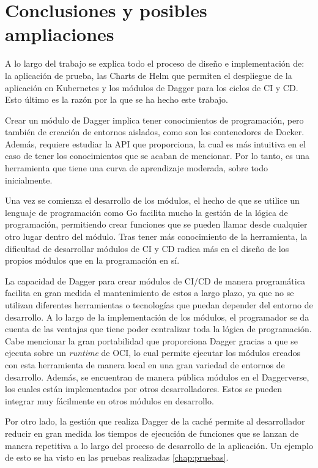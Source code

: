 \chapter{Conclusiones y posibles ampliaciones}


A lo largo del trabajo se explica todo el proceso de diseño e implementación de: la aplicación de prueba, las Charts de Helm que permiten el despliegue de la aplicación en Kubernetes y los módulos de Dagger para los ciclos de CI y CD. Esto último es la razón por la que se ha hecho este trabajo.

Crear un módulo de Dagger implica tener conocimientos de programación, pero también de creación de entornos aislados, como son los contenedores de Docker. Además, requiere estudiar la API que proporciona, la cual es más intuitiva en el caso de tener los conocimientos que se acaban de mencionar. Por lo tanto, es una herramienta que tiene una curva de aprendizaje moderada, sobre todo inicialmente.

Una vez se comienza el desarrollo de los módulos, el hecho de que se utilice un lenguaje de programación como Go facilita mucho la gestión de la lógica de programación, permitiendo crear funciones que se pueden llamar desde cualquier otro lugar dentro del módulo. Tras tener más conocimiento de la herramienta, la dificultad de desarrollar módulos de CI y CD radica más en el diseño de los propios módulos que en la programación en sí.

La capacidad de Dagger para crear módulos de CI/CD de manera programática facilita en gran medida el mantenimiento de estos a largo plazo, ya que no se utilizan diferentes herramientas o tecnologías que puedan depender del entorno de desarrollo. A lo largo de la implementación de los módulos, el programador se da cuenta de las ventajas que tiene poder centralizar toda la lógica de programación. Cabe mencionar la gran portabilidad que proporciona Dagger gracias a que se ejecuta sobre un \textit{runtime} de OCI, lo cual permite ejecutar los módulos creados con esta herramienta de manera local en una gran variedad de entornos de desarrollo. Además, se encuentran de manera pública módulos en el Daggerverse, los cuales están implementados por otros desarrolladores. Estos se pueden integrar muy fácilmente en otros módulos en desarrollo.

Por otro lado, la gestión que realiza Dagger de la caché permite al desarrollador reducir en gran medida los tiempos de ejecución de funciones que se lanzan de manera repetitiva a lo largo del proceso de desarrollo de la aplicación. Un ejemplo de esto se ha visto en las pruebas realizadas \ref{chap:pruebas}.

